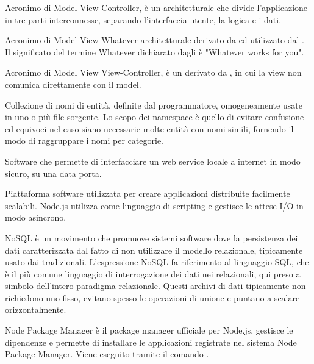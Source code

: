 Acronimo di Model View Controller, è un  architetturale che divide l'applicazione in tre parti interconnesse, separando l'interfaccia utente, la logica e i dati.

Acronimo di Model View Whatever   architetturale derivato da  ed utilizzato dal  .
Il significato del termine Whatever dichiarato dagli  è "Whatever works for you".

Acronimo di Model View View-Controller, è un  derivato da , in cui la view non comunica direttamente con il model.


Collezione di nomi di entità, definite dal programmatore, omogeneamente usate in uno o più file sorgente.  Lo scopo dei namespace è quello di evitare confusione ed equivoci nel caso siano necessarie molte entità con nomi simili, fornendo il modo di raggruppare i nomi per categorie. 

Software che permette di interfacciare un web service locale a internet in modo sicuro, su una data porta.

Piattaforma software utilizzata per creare applicazioni distribuite facilmente scalabili.
Node.js utilizza  come linguaggio di scripting e gestisce le attese I/O in modo asincrono.

NoSQL è un movimento che promuove sistemi software dove la persistenza dei dati caratterizzata dal fatto di non utilizzare il modello relazionale, tipicamente usato dai  tradizionali. L'espressione NoSQL fa riferimento al linguaggio SQL, che è il più comune linguaggio di interrogazione dei dati nei  relazionali, qui preso a simbolo dell'intero paradigma relazionale.
Questi archivi di dati tipicamente non richiedono uno  fisso, evitano spesso le operazioni di unione e puntano a scalare orizzontalmente.

Node Package Manager è il package manager ufficiale per Node.js, gestisce le dipendenze e permette di installare le applicazioni registrate nel sistema Node Package Manager. Viene eseguito tramite il comando .


